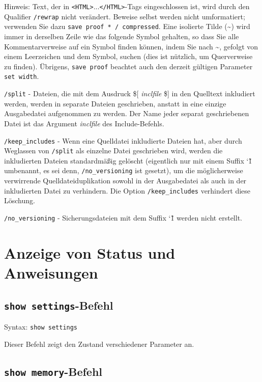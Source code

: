 Hinweis: Text, der in \texttt{<HTML>}...\texttt{</HTML>}-Tags eingeschlossen ist, wird durch den Qualifier \texttt{/rewrap} nicht verändert. Beweise selbst werden nicht umformatiert; verwenden Sie dazu \texttt{save proof * / compressed}. Eine isolierte Tilde (\~{}) wird immer in derselben Zeile wie das folgende Symbol gehalten, so dass Sie alle Kommentarverweise auf ein Symbol finden können, indem Sie nach \~{}, gefolgt von einem Leerzeichen und dem Symbol, suchen (dies ist nützlich, um Querverweise zu finden). Übrigens, \texttt{save proof} beachtet auch den derzeit gültigen Parameter \texttt{set width}.

\texttt{/split} - 
Dateien, die mit dem Ausdruck \$[ \textit{inclfile} \$] in den Quelltext inkludiert werden, werden in separate Dateien geschrieben, anstatt in eine einzige Ausgabedatei aufgenommen zu werden.  Der Name jeder separat geschriebenen Datei ist das Argument \textit{inclfile} des Include-Befehls. 

\texttt{/keep\_includes} - 
Wenn eine Quelldatei inkludierte Dateien hat, aber durch Weglassen von \texttt{/split} als einzelne Datei geschrieben wird, werden die inkludierten Dateien standardmäßig gelöscht (eigentlich nur mit einem Suffix \char`\~1 umbenannt, es sei denn, \texttt{/no\_versioning} ist gesetzt), um die möglicherweise verwirrende Quelldateiduplikation sowohl in der Ausgabedatei als auch in der inkludierten Datei zu verhindern. Die Option \texttt{/keep\_includes} verhindert diese Löschung. 

\texttt{/no\_versioning} - 
Sicherungsdateien mit dem Suffix \char`\~1 werden nicht erstellt.


\section{Anzeige von Status und Anweisungen}

\subsection{\texttt{show settings}-Befehl}

Syntax:  \texttt{show settings}

Dieser Befehl zeigt den Zustand verschiedener Parameter an.

\subsection{\texttt{show memory}-Befehl}

